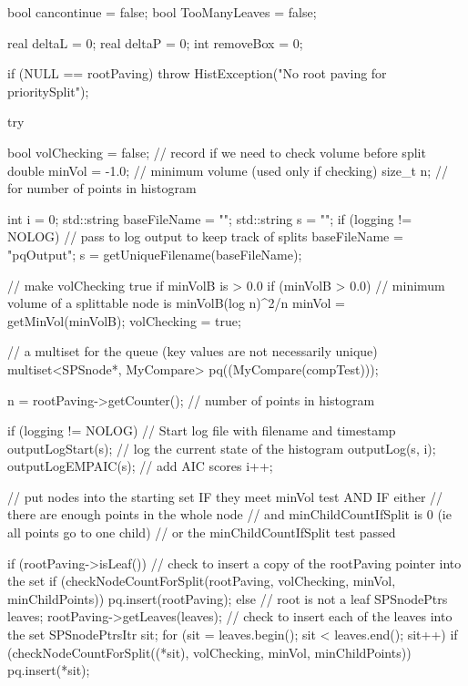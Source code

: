 \begin{DoxyCode}
{   
    bool cancontinue = false;
    bool TooManyLeaves = false;
    
    real deltaL = 0;
    real deltaP = 0;
    int removeBox = 0;
    
    if (NULL == rootPaving) {
            throw HistException("No root paving for prioritySplit");
    }

    try {

        bool volChecking = false; // record if we need to check volume before
       split
        double minVol = -1.0; // minimum volume (used only if checking)
        size_t n; // for number of points in histogram

        int i = 0;
        std::string baseFileName = "";
        std::string s = "";
        if (logging != NOLOG) {
            // pass to log output to keep track of splits
            baseFileName = "pqOutput";
            s = getUniqueFilename(baseFileName);
        }

        // make volChecking true if minVolB is > 0.0
        if (minVolB > 0.0) {
            // minimum volume of a splittable node is minVolB(log n)^2/n
            minVol = getMinVol(minVolB);
           volChecking = true;
        }

        // a multiset for the queue (key values are not necessarily unique)
        multiset<SPSnode*, MyCompare> pq((MyCompare(compTest)));

        n = rootPaving->getCounter(); // number of points in histogram

        if (logging != NOLOG) {
             // Start log file with filename and timestamp
            outputLogStart(s);
            // log the current state of the histogram
            outputLog(s, i);
            outputLogEMPAIC(s); // add AIC scores
            i++;
        }

        // put nodes into the starting set IF they meet minVol test AND IF
       either
        // there are enough points in the whole node
                // and minChildCountIfSplit is 0 (ie all points go to one
       child)
        // or the minChildCountIfSplit test passed

        if (rootPaving->isLeaf()) {
            // check to insert a copy of the rootPaving pointer into the set
            if (checkNodeCountForSplit(rootPaving, volChecking, minVol,
                minChildPoints)) {
                    pq.insert(rootPaving);
            }
        }
        else { // root is not a leaf
            SPSnodePtrs leaves;
            rootPaving->getLeaves(leaves);
            // check to insert each of the leaves into the set
            SPSnodePtrsItr sit;
            for (sit = leaves.begin(); sit < leaves.end(); sit++) {
                if (checkNodeCountForSplit((*sit), volChecking, minVol,
                minChildPoints)) {
                    pq.insert(*sit);
                }
            }
        }

}}
\end{DoxyCode}
